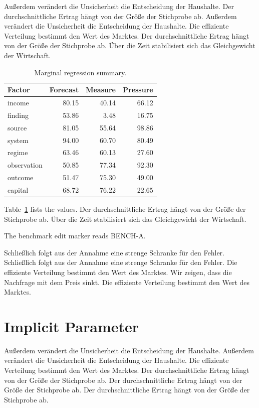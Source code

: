 \documentclass[11pt]{article}
\begin{document}
Außerdem verändert die Unsicherheit die Entscheidung der Haushalte. Der durchschnittliche Ertrag hängt von der Größe der Stichprobe ab. Außerdem verändert die Unsicherheit die Entscheidung der Haushalte. Die effiziente Verteilung bestimmt den Wert des Marktes. Der durchschnittliche Ertrag hängt von der Größe der Stichprobe ab. Über die Zeit stabilisiert sich das Gleichgewicht der Wirtschaft.

\begin{table}[tbp]\centering\caption{Marginal regression summary.}\label{tab:b3}\begin{tabular}{lrrr}\toprule Factor & Forecast & Measure & Pressure \\ \midrule
income & 80.15 & 40.14 & 66.12 \\
finding & 53.86 & 3.48 & 16.75 \\
source & 81.05 & 55.64 & 98.86 \\
system & 94.00 & 60.70 & 80.49 \\
regime & 63.46 & 60.13 & 27.60 \\
observation & 50.85 & 77.34 & 92.30 \\
outcome & 51.47 & 75.30 & 49.00 \\
capital & 68.72 & 76.22 & 22.65 \\
\bottomrule\end{tabular}\end{table}

Table~\ref{tab:b3} lists the values. Der durchschnittliche Ertrag hängt von der Größe der Stichprobe ab. Über die Zeit stabilisiert sich das Gleichgewicht der Wirtschaft.

The benchmark edit marker reads BENCH-A.

Schließlich folgt aus der Annahme eine strenge Schranke für den Fehler. Schließlich folgt aus der Annahme eine strenge Schranke für den Fehler. Die effiziente Verteilung bestimmt den Wert des Marktes. Wir zeigen, dass die Nachfrage mit dem Preis sinkt. Die effiziente Verteilung bestimmt den Wert des Marktes.

\section{Implicit Parameter}\label{sec:4}

Außerdem verändert die Unsicherheit die Entscheidung der Haushalte. Außerdem verändert die Unsicherheit die Entscheidung der Haushalte. Die effiziente Verteilung bestimmt den Wert des Marktes. Der durchschnittliche Ertrag hängt von der Größe der Stichprobe ab. Der durchschnittliche Ertrag hängt von der Größe der Stichprobe ab. Der durchschnittliche Ertrag hängt von der Größe der Stichprobe ab.
\end{document}

